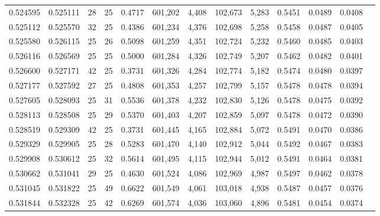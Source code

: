 \begin{tabular}{rrrrrrrrrrrrr}
0.524595 & 0.525111 &    28 &  25 &                                     0.4717 & 601,202 &   4,408 & 102,673 &   5,283 & 0.5451 & 0.0489 & 0.0408 \\
0.525112 & 0.525570 &    32 &  25 &                                     0.4386 & 601,234 &   4,376 & 102,698 &   5,258 & 0.5458 & 0.0487 & 0.0405 \\
0.525580 & 0.526115 &    25 &  26 &                                     0.5098 & 601,259 &   4,351 & 102,724 &   5,232 & 0.5460 & 0.0485 & 0.0403 \\
0.526116 & 0.526569 &    25 &  25 &                                     0.5000 & 601,284 &   4,326 & 102,749 &   5,207 & 0.5462 & 0.0482 & 0.0401 \\
0.526600 & 0.527171 &    42 &  25 &                                     0.3731 & 601,326 &   4,284 & 102,774 &   5,182 & 0.5474 & 0.0480 & 0.0397 \\
0.527177 & 0.527592 &    27 &  25 &                                     0.4808 & 601,353 &   4,257 & 102,799 &   5,157 & 0.5478 & 0.0478 & 0.0394 \\
0.527605 & 0.528093 &    25 &  31 &                                     0.5536 & 601,378 &   4,232 & 102,830 &   5,126 & 0.5478 & 0.0475 & 0.0392 \\
0.528113 & 0.528508 &    25 &  29 &                                     0.5370 & 601,403 &   4,207 & 102,859 &   5,097 & 0.5478 & 0.0472 & 0.0390 \\
0.528519 & 0.529309 &    42 &  25 &                                     0.3731 & 601,445 &   4,165 & 102,884 &   5,072 & 0.5491 & 0.0470 & 0.0386 \\
0.529329 & 0.529905 &    25 &  28 &                                     0.5283 & 601,470 &   4,140 & 102,912 &   5,044 & 0.5492 & 0.0467 & 0.0383 \\
0.529908 & 0.530612 &    25 &  32 &                                     0.5614 & 601,495 &   4,115 & 102,944 &   5,012 & 0.5491 & 0.0464 & 0.0381 \\
0.530662 & 0.531041 &    29 &  25 &                                     0.4630 & 601,524 &   4,086 & 102,969 &   4,987 & 0.5497 & 0.0462 & 0.0378 \\
0.531045 & 0.531822 &    25 &  49 &                                     0.6622 & 601,549 &   4,061 & 103,018 &   4,938 & 0.5487 & 0.0457 & 0.0376 \\
0.531844 & 0.532328 &    25 &  42 &                                     0.6269 & 601,574 &   4,036 & 103,060 &   4,896 & 0.5481 & 0.0454 & 0.0374 \\

\end{tabular}
